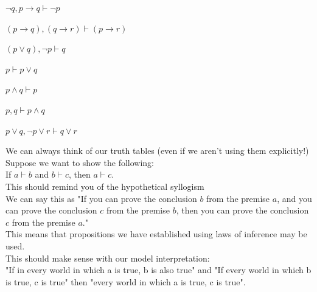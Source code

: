 \begin{defn}
$\lnot q,p\to q \vdash \lnot p$
\end{defn}
\begin{defn}
$(p \to q) , (q \to r) \vdash (p \to r)$
\end{defn}
\begin{defn}
$(p \lor q),\lnot p \vdash q$
\end{defn}
\begin{defn}[Addition]
$p \vdash p \lor q$
\end{defn}
\begin{defn}[Simplification]
$p \land q\vdash p$
\end{defn}
\begin{defn}[Conjunction]
$p,q \vdash p \land q$
\end{defn}
\begin{defn}[Resolution]
$p \lor q, \lnot p \lor r  \vdash q \lor r$
\end{defn}
\newpage 
\begin{rem}
We can always think of our truth tables (even if we aren't using them explicitly!)\\
Suppose we want to show the following:\\
If $a\vdash b$ and $b \vdash c$, then $a\vdash c$. \\
This should remind you of the hypothetical syllogism\\
We can say this as "If you can prove the conclusion $b$ from the premise $a$, and you can prove the conclusion $c$ from the premise $b$, then you can prove the conclusion $c$ from the premise $a$."
\\
This means that propositions we have established using laws of inference may be used.
\\
This should make sense with our model interpretation:\\
"If in every world in which a is true, b is also true" and "If every world in which b is true, c is true" then "every world in which a is true, c is true". 
\\
\end{rem}
